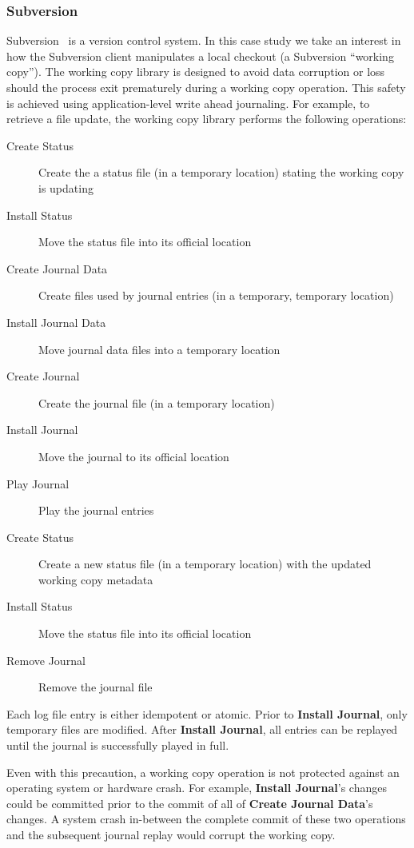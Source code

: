 \subsubsection{Subversion}
\label{sec:opgroup:svn}

Subversion~\cite{svn} is a version control system.
%
In this case study we take an interest in how the Subversion client
manipulates a local checkout (a Subversion ``working copy'').
%
The working copy library is designed to avoid data corruption or loss
should the process exit prematurely during a working copy operation.
%
This safety is achieved using application-level write ahead
journaling.
%
For example, to retrieve a file update, the working copy library
performs the following operations:
%
\begin{description}
\item[Create Status] Create the a status file (in a temporary location)
  stating the working copy is updating
\item[Install Status] Move the status file into its official location
\item[Create Journal Data] Create files used by journal entries (in a
  temporary, temporary location)
\item[Install Journal Data] Move journal data files into a temporary
  location
\item[Create Journal] Create the journal file (in a temporary location)
\item[Install Journal] Move the journal to its official location
\item[Play Journal] Play the journal entries
\item[Create Status] Create a new status file (in a temporary location)
  with the updated working copy metadata
\item[Install Status] Move the status file into its official location
\item[Remove Journal] Remove the journal file
\end{description}
%
Each log file entry is either idempotent or atomic.
%
Prior to \textbf{Install Journal}, only temporary files are modified.
After \textbf{Install Journal}, all entries can be replayed until the
journal is successfully played in full.

Even with this precaution, a working copy operation is not protected
against an operating system or hardware crash.
%
For example, \textbf{Install Journal}'s changes could be committed
prior to the commit of all of \textbf{Create Journal Data}'s changes.
%
A system crash in-between the complete commit of these two operations
and the subsequent journal replay would corrupt the working copy.


